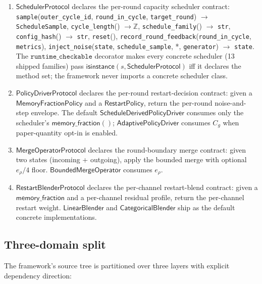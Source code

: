 \documentclass[journal,twocolumn,final]{IEEEtran}
\newcommand{\egap}{e_\rho}
\newcommand{\sheetC}{C_g}
\begin{document}
\begin{enumerate}
\item $\mathsf{SchedulerProtocol}$ declares the per-round capacity scheduler
contract: \texttt{sample}(\texttt{outer\_cycle\_id},
\texttt{round\_in\_cycle}, \texttt{target\_round}) $\to$
\texttt{ScheduleSample}, \texttt{cycle\_length}() $\to \mathbb{Z}$,
\texttt{schedule\_family}() $\to$ \texttt{str}, \texttt{config\_hash}() $\to$
\texttt{str}, \texttt{reset}(),
\texttt{record\_round\_feedback}(\texttt{round\_in\_cycle}, \texttt{metrics}),
\texttt{inject\_noise}(\texttt{state}, \texttt{schedule\_sample}, *,
\texttt{generator}) $\to$ \texttt{state}. The $\texttt{runtime\_checkable}$
decorator makes every concrete scheduler (13 shipped families) pass
$\mathsf{isinstance}(s, \mathsf{SchedulerProtocol})$ iff it declares the
method set; the framework never imports a concrete scheduler class.

\item $\mathsf{PolicyDriverProtocol}$ declares the per-round restart-decision
contract: given a $\mathsf{MemoryFractionPolicy}$ and a $\mathsf{RestartPolicy}$,
return the per-round noise-and-step envelope. The default
$\mathsf{ScheduleDerivedPolicyDriver}$ consumes only the scheduler's
$\mathsf{memory\_fraction}()$; $\mathsf{AdaptivePolicyDriver}$ consumes
$\sheetC$ when paper-quantity opt-in is enabled.

\item $\mathsf{MergeOperatorProtocol}$ declares the round-boundary merge
contract: given two states (incoming + outgoing), apply the bounded merge with
optional $\egap/4$ floor. $\mathsf{BoundedMergeOperator}$ consumes $\egap$.

\item $\mathsf{RestartBlenderProtocol}$ declares the per-channel
restart-blend contract: given a $\mathsf{memory\_fraction}$ and a per-channel
residual profile, return the per-channel restart weight. $\mathsf{LinearBlender}$
and $\mathsf{CategoricalBlender}$ ship as the default concrete
implementations.
\end{enumerate}

\subsection{Three-domain split}

The framework's source tree is partitioned over three layers with explicit
dependency direction:
\end{document}
